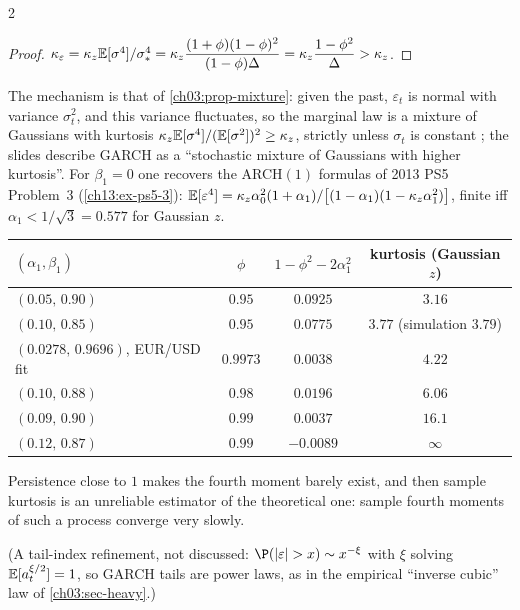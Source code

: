\begin{paracol}{2}
\begin{proof}
$\kappa_\varepsilon=\kappa_z\mathbb{E}[\sigma^4]/\sigma_*^4=\kappa_z\dfrac{(1+\phi)(1-\phi)^2}{(1-\phi)\Delta}=\kappa_z\dfrac{1-\phi^2}{\Delta}>\kappa_z$.
\end{proof}
The mechanism is that of \cref{ch03:prop-mixture}: given the past, $\varepsilon_t$ is normal with variance $\sigma_t^2$, and this variance fluctuates, so the marginal law is a mixture of
Gaussians with kurtosis $\kappa_z\mathbb{E}[\sigma^4]/(\mathbb{E}[\sigma^2])^2\ge\kappa_z$, strictly unless $\sigma_t$ is constant ; the slides describe GARCH as a ``stochastic mixture of Gaussians with higher kurtosis''.
For $\beta_1=0$ one recovers the ARCH$(1)$ formulas of 2013 PS5 Problem~3 (\cref{ch13:ex-ps5-3}): $\mathbb{E}[\varepsilon^4]=\kappa_z\alpha_0^2(1+\alpha_1)/\bigl[(1-\alpha_1)(1-\kappa_z\alpha_1^2)\bigr]$, finite iff $\alpha_1<1/\sqrt3=0.577$ for Gaussian $z$.

\begin{secondary}
\begin{center}\small
\begin{tabular}{@{}lccc@{}}
\toprule
$(\alpha_1,\beta_1)$ & $\phi$ & $1-\phi^2-2\alpha_1^2$ & kurtosis (Gaussian $z$)\\
\midrule
$(0.05,\,0.90)$ & $0.95$ & $0.0925$ & $3.16$\\
$(0.10,\,0.85)$ & $0.95$ & $0.0775$ & $3.77$ (simulation $3.79$)\\
$(0.0278,\,0.9696)$, EUR/USD fit & $0.9973$ & $0.0038$ & $4.22$\\
$(0.10,\,0.88)$ & $0.98$ & $0.0196$ & $6.06$\\
$(0.09,\,0.90)$ & $0.99$ & $0.0037$ & $16.1$\\
$(0.12,\,0.87)$ & $0.99$ & $-0.0089$ & $\infty$\\
\bottomrule
\end{tabular}
\end{center}
\end{secondary}
Persistence close to $1$ makes the fourth moment barely exist, and then sample kurtosis is an unreliable estimator of the theoretical one: sample fourth moments of such a process converge very slowly.
\begin{secondary}
(A tail-index refinement, not discussed: $\P(|\varepsilon|>x)\sim x^{-\xi}$ with $\xi$ solving $\mathbb{E}[a_t^{\xi/2}]=1$, so GARCH tails are power laws, as in the empirical ``inverse cubic'' law of \cref{ch03:sec-heavy}.)
\end{secondary}


\end{paracol}
